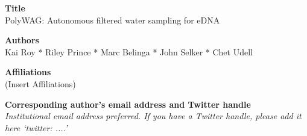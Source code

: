 \documentclass[11pt, letterpaper]{article}
\begin{document}
\begin{flushleft}



\setlength{\parindent}{0pt}
\setlength{\parskip}{10pt}


%
%
\textbf{Title} \\
PolyWAG: Autonomous filtered water sampling for eDNA 


\textbf{Authors} \\
Kai Roy * Riley Prince * Marc Belinga * John Selker * Chet Udell


\textbf{Affiliations} \\ 
(Insert Affiliations)


\textbf{Corresponding author’s email address and Twitter handle}\\ 
\textit{Institutional email address preferred. If you have a Twitter handle, please add it here ‘twitter: \@....’}


\end{flushleft}
\end{document}
